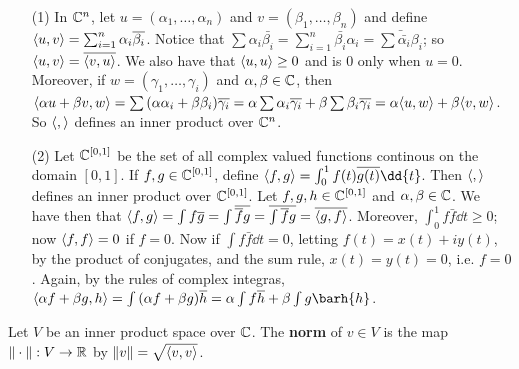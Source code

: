 \begin{example}
    \begin{enumerate}		
        \item[(1)] In $\mathbb{C}^n$, let $u=(\alpha_1, \dots, \alpha_n)$ and $v=(\beta_1, \dots, \beta_n)$ and
            define $\langle u,v\rangle=\sum_{i=1}^n{\alpha_i\overline{\beta_i}}$. Notice that 
            $\sum{\alpha_i\bar{\beta_i}}=\sum_{i=1}^n{\bar{\beta_i}\alpha_i}=\bar{\sum{\bar{\alpha_i}\beta_i}}$;
            so $\langle u,v\rangle=\overline{\langle v,u\rangle}$. We also have that $\langle u,u\rangle \geq 0$ and is
            $0$ only when  $u=0$. Moreover, if  $w=(\gamma_1, \dots, \gamma_i)$ and
            $\alpha,\beta \in \mathbb{C}$, then  $\langle \alpha u+\beta
            v,w\rangle=\sum{(\alpha\alpha_i+\beta\beta_i)\overline{\gamma_i}}=\alpha\sum{\alpha_i}\overline{\gamma_i}+
            \beta\sum{\beta_i}\overline{\gamma_i}=\alpha\langle u,w\rangle+\beta\langle v,w\rangle$. So
            $\langle ,\rangle$ defines an inner product over $\mathbb{C}^n$.

        \item[(2)] Let $\mathbb{C}^{[0,1]}$ be the set of all complex valued functions continous on the
            domain $[0,1]$. If $f,g \in \mathbb{C}^{[0,1]}$, define
            $\vbrack{f,g}=\int_{0}^1{f(t)\bar{g(t)}}\dd{t}$. Then $\langle ,\rangle$ defines an inner
            product over $\mathbb{C}^{[0,1]}$. Let $f,g,h \in \mathbb{C}^{[0,1]}$ and $\alpha,\beta \in \mathbb{C}$. We have
            then that
            $\langle f,g\rangle=\int{f\overline{g}}=\int{\overline{\overline{f}g}}=\overline{\int{\overline{f}g}}=\overline{\langle g,f\rangle}$.
        Moreover, $\int_{0}^1{f\bar{f}}\dd{t} \geq 0$; now  $\langle f,f\rangle=0$ if $f=0$. Now if
            $\int{f\bar{f} \dd{t}=0}$, letting  $f(t)=x(t)+iy(t)$, by the product of conjugates, and
            the sum rule, $x(t)=y(t)=0$, i.e. $f=0$. Again, by the rules of complex integras,
            $\vbrack{\alpha f+\beta g,h}=\int{(\alpha f+\beta
            g)\bar{h}}=\alpha\int{f\bar{h}}+\beta\int{g\barh{h}}$.
    \end{enumerate}
\end{example} 

\begin{definition}
    Let $V$ be an inner product space over  $\mathbb{C}$. The  \textbf{norm} of $v \in V$ is the map
    $\|\cdot\|:V \rightarrow \mathbb{R}$ by  $\|v\|=\sqrt{\langle v,v\rangle}$.
\end{definition}

